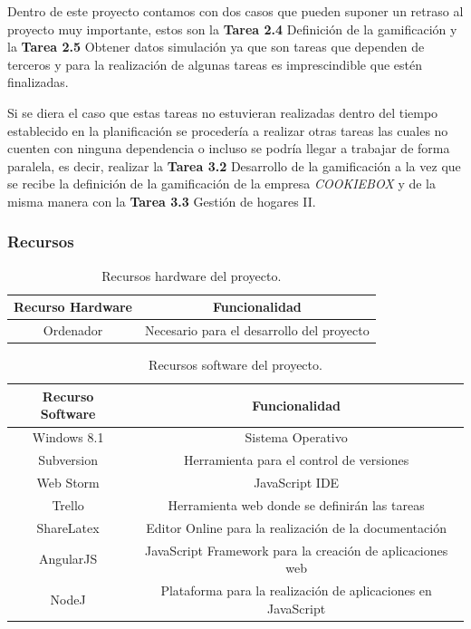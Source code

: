 Dentro de este proyecto contamos con dos casos que pueden suponer un retraso al proyecto muy importante, estos son la \textbf{Tarea 2.4} Definición de la gamificación y la \textbf{Tarea 2.5} Obtener datos simulación ya que son tareas que dependen de terceros y para la realización de algunas tareas es imprescindible que estén finalizadas.

Si se diera el caso que estas tareas no estuvieran realizadas dentro del tiempo establecido en la planificación se procedería a realizar otras tareas las cuales no cuenten con ninguna dependencia o incluso se podría llegar a trabajar de forma paralela, es decir, realizar la \textbf{Tarea 3.2} Desarrollo de la gamificación a la vez que se recibe la definición de la gamificación de la empresa \textit{COOKIEBOX} y de la misma manera con la \textbf{Tarea 3.3} Gestión de hogares II.

\subsubsection{Recursos}

\begin{table}[h]
\begin{center}
\begin{tabular}{@{}cc@{}}
\toprule
\textbf{Recurso Hardware} & \textbf{Funcionalidad} \\ \midrule
Ordenador & Necesario para el desarrollo del proyecto \\ \bottomrule
\end{tabular}
\end{center}
\caption{Recursos hardware del proyecto. \label{tab:recursosHard}}
\end{table}

\begin{table}[h]
\begin{center}
\begin{tabular}{@{}cc@{}}
\toprule
\textbf{Recurso Software} & \textbf{Funcionalidad}                                       \\ \midrule
Windows 8.1               & Sistema Operativo                                            \\
Subversion                & Herramienta para el control de versiones                     \\
Web Storm                 & JavaScript IDE                                               \\
Trello                    & Herramienta web donde se definirán las tareas                \\
ShareLatex                & Editor Online para la realización de la documentación        \\
AngularJS                 & JavaScript Framework para la creación de aplicaciones web    \\
NodeJ                     & Plataforma para la realización de aplicaciones en JavaScript \\ \bottomrule
\end{tabular}
\end{center}
\caption{Recursos software del proyecto. \label{tab:recursosSoft}}
\end{table}

